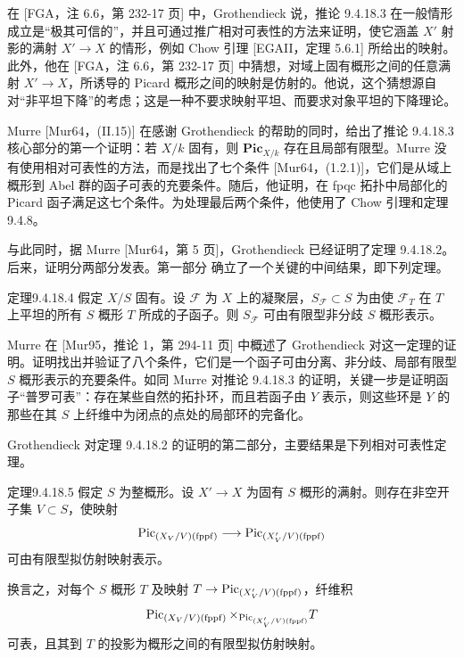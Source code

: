 在 [FGA，注 6.6，第 232-17 页] 中，Grothendieck 说，推论 9.4.18.3 在一般情形成立是“极其可信的”，并且可通过推广相对可表性的方法来证明，使它涵盖 $X'$ 射影的满射 $X'\to X$ 的情形，例如 Chow 引理 [EGAII，定理 5.6.1] 所给出的映射。此外，他在 [FGA，注 6.6，第 232-17 页] 中猜想，对域上固有概形之间的任意满射 $X'\to X$，所诱导的 Picard 概形之间的映射是仿射的。他说，这个猜想源自对“非平坦下降”的考虑；这是一种不要求映射平坦、而要求对象平坦的下降理论。

Murre [Mur64，(II.15)] 在感谢 Grothendieck 的帮助的同时，给出了推论 9.4.18.3 核心部分的第一个证明：若 $X/k$ 固有，则 $\mathbf{Pic}_{X/k}$ 存在且局部有限型。Murre 没有使用相对可表性的方法，而是找出了七个条件 [Mur64，(1.2.1)]，它们是从域上概形到 Abel 群的函子可表的充要条件。随后，他证明，在 fpqc 拓扑中局部化的 Picard 函子满足这七个条件。为处理最后两个条件，他使用了 Chow 引理和定理 9.4.8。

与此同时，据 Murre [Mur64，第 5 页]，Grothendieck 已经证明了定理 9.4.18.2。后来，证明分两部分发表。第一部分
确立了一个关键的中间结果，即下列定理。

\begin{origstatement}{定理}{9.4.18.4}\label{ch09s04:9.4.18.4}
假定 $X/S$ 固有。设 $\mathcal F$ 为 $X$ 上的凝聚层，$S_{\mathcal F}\subset S$ 为由使 $\mathcal F_T$ 在 $T$ 上平坦的所有 $S$ 概形 $T$ 所成的子函子。则 $S_{\mathcal F}$ 可由有限型非分歧 $S$ 概形表示。
\end{origstatement}
Murre 在 [Mur95，推论 1，第 294-11 页] 中概述了 Grothendieck 对这一定理的证明。证明找出并验证了八个条件，它们是一个函子可由分离、非分歧、局部有限型 $S$ 概形表示的充要条件。如同 Murre 对推论 9.4.18.3 的证明，关键一步是证明函子“普罗可表”：存在某些自然的拓扑环，而且若函子由 $Y$ 表示，则这些环是 $Y$ 的那些在其 $S$ 上纤维中为闭点的点处的局部环的完备化。

Grothendieck 对定理 9.4.18.2 的证明的第二部分，主要结果是下列相对可表性定理。

\begin{origstatement}{定理}{9.4.18.5}\label{ch09s04:9.4.18.5}
假定 $S$ 为整概形。设 $X'\to X$ 为固有 $S$ 概形的满射。则存在非空开子集 $V\subset S$，使映射
\[
\operatorname{Pic}_{(X_V/V)(\mathrm{fppf})}\longrightarrow
\operatorname{Pic}_{(X'_V/V)(\mathrm{fppf})}
\]
可由有限型拟仿射映射表示。
\end{origstatement}
换言之，对每个 $S$ 概形 $T$ 及映射 $T\to\operatorname{Pic}_{(X'_V/V)(\mathrm{fppf})}$，纤维积
\[
\operatorname{Pic}_{(X_V/V)(\mathrm{fppf})}
\times_{\operatorname{Pic}_{(X'_V/V)(\mathrm{fppf})}}T
\]
可表，且其到 $T$ 的投影为概形之间的有限型拟仿射映射。

